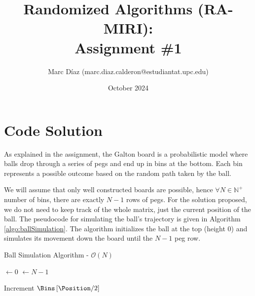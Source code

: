 \documentclass[a4paper, 11pt]{article}
\title{Randomized Algorithms (RA-MIRI): \\
        Assignment \#1
        }
\author{%
    Marc Díaz (marc.diaz.calderon@estudiantat.upc.edu) 
}
\date{October 2024}
\begin{document}
\maketitle

\section{Code Solution}

As explained in the assignment, the Galton board is a probabilistic model where balls drop through a series of pegs and end up in bins at the bottom. Each bin represents a possible outcome based on the random path taken by the ball.

We will assume that only well constructed boards are possible, hence $\forall N \in \mathbb{N}^+$ number of bins, there are exactly $N-1$ rows of pegs. For the solution proposed, we do not need to keep track of the whole matrix, just the current position of the ball. The pseudocode for simulating the ball's trajectory is given in Algorithm \ref{algo:ballSimulation}. The algorithm initializes the ball at the top (height 0) and simulates its movement down the board until the $N-1$ peg row.

\begin{algorithm}[h]
    \caption{Ball Simulation Algorithm  - $\mathcal{O}(N)$}
    \label{algo:ballSimulation}
    \SetAlgoLined  


    \BlankLine
    

    \CurrentHeight $\gets 0$\;
    \Position $\gets N - 1$ 
    

    Increment $\Bins\left[\Position / 2\right]$\;

\end{algorithm}
\end{document}
